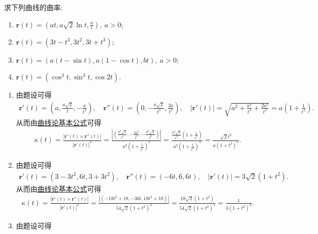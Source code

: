 \documentclass[../../main.tex]{subfiles}%
\begin{document}
\begin{solution}
\end{solution}

\begin{example}
求下列曲线的曲率:
\begin{enumerate}[(1)]
\item $\bm{r}(t) = \left(at, a\sqrt{2}\ln t, \frac{a}{t}\right),\ a>0$;
\item $\bm{r}(t) = (3t - t^3, 3t^2, 3t + t^3)$;
\item $\bm{r}(t) = (a(t - \sin t), a(1 - \cos t), bt),\ a>0$;
\item $\bm{r}(t) = (\cos^3 t, \sin^3 t, \cos 2t)$.
\end{enumerate}
\end{example}
\begin{solution}
\begin{enumerate}[(1)]
\item 由题设可得
\begin{align*}
\bm{r}'(t) = \left(a, \frac{a\sqrt{2}}{t}, -\frac{a}{t^2}\right), \quad \bm{r}''(t) = \left(0, -\frac{a\sqrt{2}}{t^2}, \frac{2a}{t^3}\right), \quad |\bm{r}'(t)| = \sqrt{a^2+\frac{a^2}{t^4}+\frac{2a^2}{t^2}} = a\left(1+\frac{1}{t^2}\right).
\end{align*}
从而由\hyperref[theorem:曲线论基本公式]{曲线论基本公式}可得
\begin{align*}
\kappa(t) = \frac{|\bm{r}'(t) \times \bm{r}''(t)|}{|\bm{r}'(t)|^3} = \frac{\left| \left( \frac{a^2\sqrt{2}}{t^4}, -\frac{2a^2}{t^3}, -\frac{a^2\sqrt{2}}{t^2} \right) \right|}{a^3\left(1+\frac{1}{t^2}\right)^3} = \frac{\frac{a^2\sqrt{2}}{t^2}\left(1+\frac{1}{t^2}\right)}{a^3\left(1+\frac{1}{t^2}\right)^3} = \frac{\sqrt{2}t^2}{a\left(1+t^2\right)^2}.
\end{align*}
\item 由题设可得
\begin{align*}
\bm{r}'(t) = \left(3-3t^2, 6t, 3+3t^2\right), \quad \bm{r}''(t) = \left(-6t, 6, 6t\right), \quad |\bm{r}'(t)| = 3\sqrt{2}\left(1+t^2\right).
\end{align*}
从而由\hyperref[theorem:曲线论基本公式]{曲线论基本公式}可得
\begin{align*}
\kappa(t) = \frac{|\bm{r}'(t) \times \bm{r}''(t)|}{|\bm{r}'(t)|^3} = \frac{\left| \left( -18t^2+18, -36t, 18t^2+18 \right) \right|}{54\sqrt{2}\left(1+t^2\right)^3} = \frac{18\sqrt{2}\left(1+t^2\right)}{54\sqrt{2}\left(1+t^2\right)^3} = \frac{1}{3\left(1+t^2\right)^2}.
\end{align*}
\item 由题设可得
\begin{align*}

\end{align*}
\end{enumerate}
\end{solution}
\end{document}
